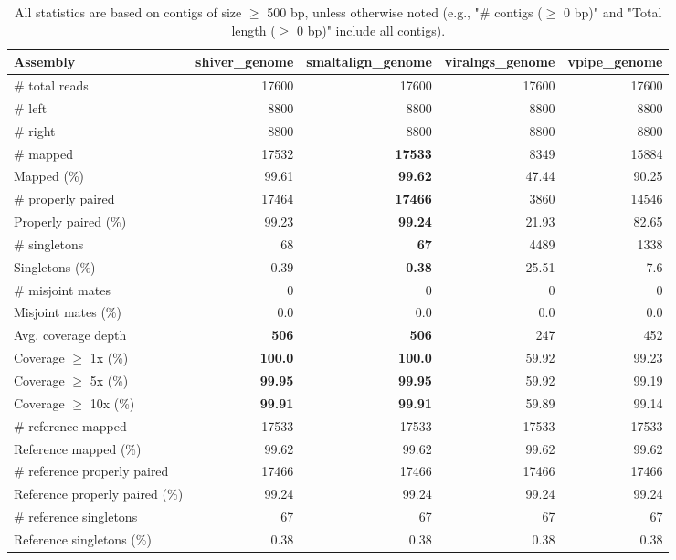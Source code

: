 \documentclass[12pt,a4paper]{article}
\begin{document}
\begin{table}[ht]
\begin{center}
\caption{All statistics are based on contigs of size $\geq$ 500 bp, unless otherwise noted (e.g., "\# contigs ($\geq$ 0 bp)" and "Total length ($\geq$ 0 bp)" include all contigs).}
\begin{tabular}{|l*{4}{|r}|}
\hline
Assembly & shiver\_genome & smaltalign\_genome & viralngs\_genome & vpipe\_genome \\ \hline
\# total reads & 17600 & 17600 & 17600 & 17600 \\ \hline
\# left & 8800 & 8800 & 8800 & 8800 \\ \hline
\# right & 8800 & 8800 & 8800 & 8800 \\ \hline
\# mapped & 17532 & {\bf 17533} & 8349 & 15884 \\ \hline
Mapped (\%) & 99.61 & {\bf 99.62} & 47.44 & 90.25 \\ \hline
\# properly paired & 17464 & {\bf 17466} & 3860 & 14546 \\ \hline
Properly paired (\%) & 99.23 & {\bf 99.24} & 21.93 & 82.65 \\ \hline
\# singletons & 68 & {\bf 67} & 4489 & 1338 \\ \hline
Singletons (\%) & 0.39 & {\bf 0.38} & 25.51 & 7.6 \\ \hline
\# misjoint mates & 0 & 0 & 0 & 0 \\ \hline
Misjoint mates (\%) & 0.0 & 0.0 & 0.0 & 0.0 \\ \hline
Avg. coverage depth & {\bf 506} & {\bf 506} & 247 & 452 \\ \hline
Coverage $\geq$ 1x (\%) & {\bf 100.0} & {\bf 100.0} & 59.92 & 99.23 \\ \hline
Coverage $\geq$ 5x (\%) & {\bf 99.95} & {\bf 99.95} & 59.92 & 99.19 \\ \hline
Coverage $\geq$ 10x (\%) & {\bf 99.91} & {\bf 99.91} & 59.89 & 99.14 \\ \hline
\# reference mapped & 17533 & 17533 & 17533 & 17533 \\ \hline
Reference mapped (\%) & 99.62 & 99.62 & 99.62 & 99.62 \\ \hline
\# reference properly paired & 17466 & 17466 & 17466 & 17466 \\ \hline
Reference properly paired (\%) & 99.24 & 99.24 & 99.24 & 99.24 \\ \hline
\# reference singletons & 67 & 67 & 67 & 67 \\ \hline
Reference singletons (\%) & 0.38 & 0.38 & 0.38 & 0.38 \\ \hline

\end{tabular}
\end{center}
\end{table}
\end{document}
